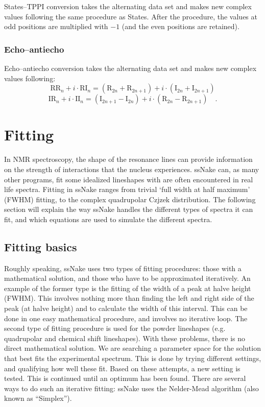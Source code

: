 \documentclass[11pt,a4paper]{article}
\begin{document}
States--TPPI conversion takes the alternating data set and makes new complex values following the
same procedure as States. After the procedure, the values at odd positions are multiplied with $-1$
(and the even positions are retained).

\subsubsection{Echo--antiecho}
Echo--antiecho conversion takes the alternating data set and makes new complex values following:
\begin{equation*}
  \text{RR}_n + i \cdot \text{RI}_n = (\text{R}_{2n} +\text{R}_{2n+1})  + i \cdot (\text{I}_{2n} +
  \text{I}_{2n+1})
\end{equation*}
\begin{equation*}
  \text{IR}_n + i \cdot \text{II}_n = (\text{I}_{2n+1} - \text{I}_{2n}) + i \cdot (\text{R}_{2n} - \text{R}_{2n+1}  ) \quad .
\end{equation*}

\section{Fitting}
In NMR spectroscopy, the shape of the resonance lines can provide information on the strength of
interactions that the nucleus experiences.  ssNake can, as many other programs, fit some idealized
lineshapes with are often encountered in real life spectra.  Fitting in ssNake ranges from trivial
`full width at half maximum' (FWHM) fitting, to the complex quadrupolar Czjzek distribution.  The
following section will explain the way ssNake handles the different types of spectra it can fit, and
which equations are used to simulate the different spectra.

\subsection{Fitting basics}
Roughly speaking, ssNake uses two types of fitting procedures: those with a mathematical solution, and those who have to be approximated iteratively.
An example of the former type is the fitting of the width of a peak at halve height (FWHM).
This involves nothing more than finding the left and right side of the peak (at halve height) and to calculate the width of this interval.
This can be done in one easy mathematical procedure, and involves no iterative loop.
The second type of fitting procedure is used for the powder lineshapes (e.g. quadrupolar and chemical shift lineshapes).
With these problems, there is no direct mathematical solution.
We are searching a parameter space for the solution that best fits the experimental spectrum.
This is done by trying different settings, and qualifying how well these fit.
Based on these attempts, a new setting is tested. This is continued until an optimum has been found.
There are several ways to do such an iterative fitting: ssNake uses the Nelder-Mead algorithm \cite{nelder1965simplex} (also known as ``Simplex'').
\end{document}
